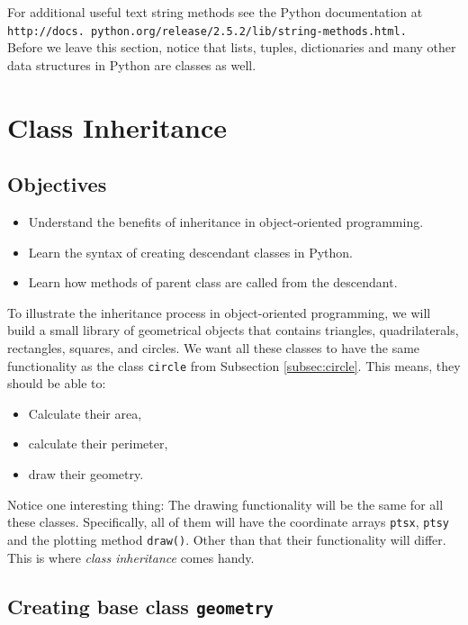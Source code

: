 \documentclass[article,A4,12pt]{llncs}
\begin{document}
\noindent
For additional useful text string methods see the Python documentation at 
{\tt http://docs. python.org/release/2.5.2/lib/string-methods.html.} \\

\noindent
Before we
leave this section, notice that lists, tuples, dictionaries and many other 
data structures in Python are classes as well.



\section{Class Inheritance}

\subsection{Objectives}

\begin{itemize}
\item Understand the benefits of inheritance in object-oriented programming.
\item Learn the syntax of creating descendant classes in Python.
\item Learn how methods of parent class are called from the descendant. 
\end{itemize}
To illustrate the inheritance process in object-oriented programming, we will
build a small library of geometrical objects that contains 
triangles, quadrilaterals, rectangles, squares, and circles. 
We want all 
these classes to have the same functionality as the class {\tt circle} from 
Subsection \ref{subsec:circle}. This means, they should be able to:
\begin{itemize}
\item Calculate their area,
\item calculate their perimeter,
\item draw their geometry.
\end{itemize}
Notice one interesting thing: The drawing functionality will be 
the same for all these classes. Specifically, all of them will have the coordinate 
arrays {\tt ptsx}, {\tt ptsy} and the plotting method {\tt draw()}. Other than 
that their functionality will differ. This is where {\em class inheritance} comes
handy.

\subsection{Creating base class {\tt geometry}}
\end{document}
